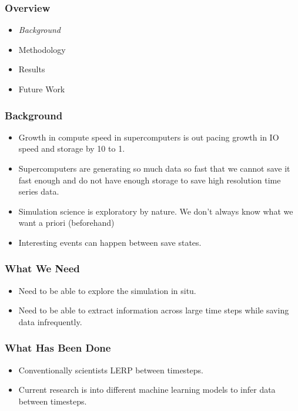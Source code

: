 \begin{frame}
\frametitle{Overview}
    \begin{itemize}
        \item \emph{\color{UOYellow}Background}
        \item Methodology 
        \item Results
        \item Future Work
    \end{itemize}
\end{frame}

\begin{frame}
\frametitle{Background}
    \begin{itemize}
        \item Growth in compute speed in supercomputers is out pacing growth in
            IO speed and storage by 10 to 1.
        \item Supercomputers are generating so much data so fast that we cannot
            save it fast enough and do not have enough storage to save high
            resolution time series data.
        \item Simulation science is exploratory by nature. We don't always know
            what we want a priori (beforehand)
        \item Interesting events can happen between save states.
    \end{itemize}
\end{frame}

\begin{frame}
\frametitle{What We Need}
    \begin{itemize}
        \item Need to be able to explore the simulation in situ.
        \item Need to be able to extract information across large time steps
            while saving data infrequently. 
    \end{itemize}
\end{frame}

\begin{frame}
    \frametitle{What Has Been Done}
    \begin{itemize}
        \item Conventionally scientists LERP between timesteps.
        \item Current research is into different machine learning models to
            infer data between timesteps. 
    \end{itemize}
\end{frame}
